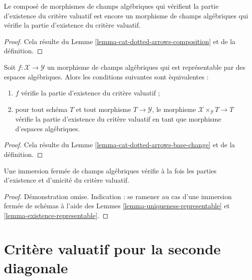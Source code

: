 \begin{lemma}
\label{lemma-composition-existence}
Le compos\'e de morphismes de champs alg\'ebriques qui v\'erifient la
partie d'existence du crit\`ere valuatif est encore un
morphisme de champs alg\'ebriques qui v\'erifie la
partie d'existence du crit\`ere valuatif.
\end{lemma}

\begin{proof}
Cela r\'esulte du Lemme \ref{lemma-cat-dotted-arrows-composition}
et de la d\'efinition.
\end{proof}

\begin{lemma}
\label{lemma-existence-representable}
Soit $f : \mathcal{X} \to \mathcal{Y}$ un morphisme de champs alg\'ebriques
qui est repr\'esentable par des espaces alg\'ebriques. Alors les conditions suivantes sont \`equivalentes :
\begin{enumerate}
\item $f$ v\'erifie la partie d'existence du crit\`ere valuatif ;
\item pour tout sch\'ema $T$ et tout morphisme $T \to \mathcal{Y}$,
le morphisme $\mathcal{X} \times_\mathcal{Y} T \to T$ v\'erifie
la partie d'existence du crit\`ere valuatif en tant que morphisme
d'espaces alg\'ebriques.
\end{enumerate}
\end{lemma}

\begin{proof}
Cela r\'esulte du Lemme \ref{lemma-cat-dotted-arrows-base-change}
et de la d\'efinition.
\end{proof}

\begin{lemma}
\label{lemma-closed-immersion-valuative-criteria}
Une immersion ferm\'ee de champs alg\'ebriques v\'erifie \`a la fois
les parties d'existence et d'unicit\'e du crit\`ere valuatif.
\end{lemma}

\begin{proof}
D\'emonstration omise. Indication : se ramener au cas d'une immersion ferm\'ee de
sch\'emas \`a l'aide des Lemmes \ref{lemma-uniqueness-representable} et
\ref{lemma-existence-representable}.
\end{proof}




\section{Critère valuatif pour la seconde diagonale}
\label{section-valuative-second}

